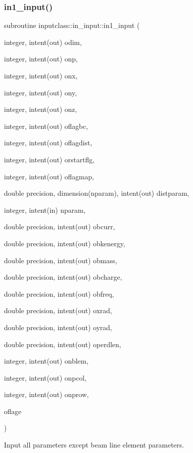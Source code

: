 \subsubsection{\texorpdfstring{in1\_input()}{in1\_input()}}
{\footnotesize\ttfamily subroutine inputclass\+::in\+\_\+input\+::in1\+\_\+input (\begin{DoxyParamCaption}\item[{integer, intent(out)}]{odim,  }\item[{integer, intent(out)}]{onp,  }\item[{integer, intent(out)}]{onx,  }\item[{integer, intent(out)}]{ony,  }\item[{integer, intent(out)}]{onz,  }\item[{integer, intent(out)}]{oflagbc,  }\item[{integer, intent(out)}]{oflagdist,  }\item[{integer, intent(out)}]{orstartflg,  }\item[{integer, intent(out)}]{oflagmap,  }\item[{double precision, dimension(nparam), intent(out)}]{distparam,  }\item[{integer, intent(in)}]{nparam,  }\item[{double precision, intent(out)}]{obcurr,  }\item[{double precision, intent(out)}]{obkenergy,  }\item[{double precision, intent(out)}]{obmass,  }\item[{double precision, intent(out)}]{obcharge,  }\item[{double precision, intent(out)}]{obfreq,  }\item[{double precision, intent(out)}]{oxrad,  }\item[{double precision, intent(out)}]{oyrad,  }\item[{double precision, intent(out)}]{operdlen,  }\item[{integer, intent(out)}]{onblem,  }\item[{integer, intent(out)}]{onpcol,  }\item[{integer, intent(out)}]{onprow,  }\item[{}]{oflage }\end{DoxyParamCaption})}



Input all parameters except beam line element parameters. 

\mbox{\label{interfaceinputclass_1_1in__input_a17f59236d66a719161eedf8fd9e0e842}} 
